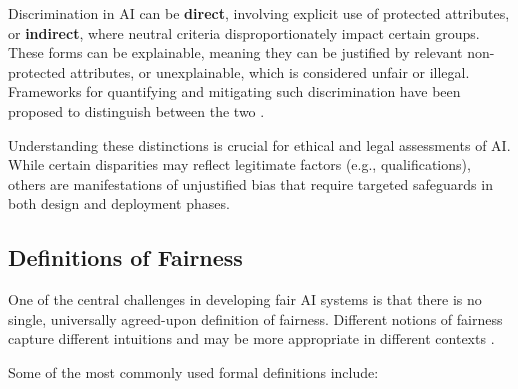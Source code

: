 \documentclass[12pt,a4paper,openright,twoside]{book}
\begin{document}
Discrimination in AI can be \textbf{direct}, involving explicit use of protected attributes, or \textbf{indirect}, where neutral criteria disproportionately impact certain groups. These forms can be explainable, meaning they can be justified by relevant non-protected attributes, or unexplainable, which is considered unfair or illegal. Frameworks for quantifying and mitigating such discrimination have been proposed to distinguish between the two \cite{kamiran2013quantifying,corbett2023measure}.

Understanding these distinctions is crucial for ethical and legal assessments of AI. While certain disparities may reflect legitimate factors (e.g., qualifications), others are manifestations of unjustified bias that require targeted safeguards in both design and deployment phases.

\subsection{Definitions of Fairness}
One of the central challenges in developing fair AI systems is that there is no single, universally agreed-upon definition of fairness. Different notions of fairness capture different intuitions and may be more appropriate in different contexts \cite{verma2018fairness} \cite{mitchell2021algorithmic}.

Some of the most commonly used formal definitions include:
\end{document}
